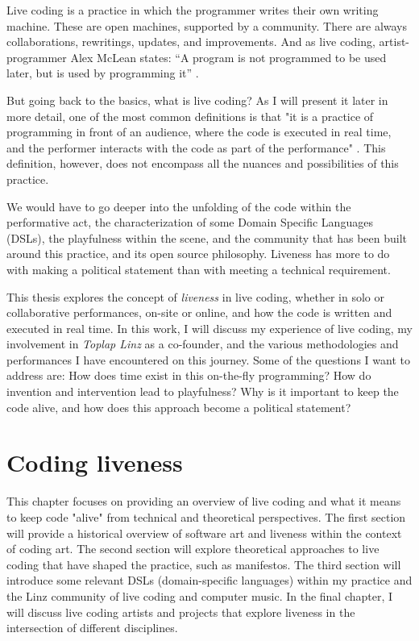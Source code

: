 \documentclass[12pt, twoside, a4paper]{report}
\begin{document}
Live coding is a practice in which the programmer writes their own writing machine. These are open machines, supported by a community.
 There are always collaborations, rewritings, updates, and improvements. And as live coding, artist-programmer Alex McLean states: ``A program is not programmed to be used later,
 but is used by programming it'' \citep{meaningLife}.

  But going back to the basics, what is live coding? As I will present it later 
  in more detail, one of the most common definitions is that "it is a practice of programming in front of an audience, where the code is executed in real time, 
  and the performer interacts with the code as part of the performance" \citep{cats}.
  This definition, however, does not encompass all the nuances and possibilities of this practice.
  
  We would have to go deeper into the unfolding of the code within the performative act,
  the characterization of some Domain Specific Languages (DSLs), the playfulness within the scene,
  and the community that has been built around this practice, 
  and its open source philosophy. Liveness has more to do with making a political statement than with meeting a technical requirement.

 This thesis explores the concept of \textit{liveness} in live coding, whether in solo or collaborative performances, on-site or online, and how the code is written and executed in real time. In this work, I will discuss my experience of live coding, my involvement in \textit{Toplap Linz} as a co-founder, and the various methodologies and performances I have encountered on this journey. Some of the questions I want to address are: How does time exist in this on-the-fly programming?
 How do invention and intervention lead to playfulness? Why is it important to keep the code alive, and how does this approach become a political statement?

\newpage

\chapter{Coding liveness}

This chapter focuses on providing an overview of live coding and what it
means to keep code "alive" from technical and theoretical perspectives.
The first section will provide a historical overview of software art and liveness within the context of coding art.
The second section will explore theoretical approaches to live coding that have shaped the practice, such as manifestos.  The third section will introduce some relevant DSLs (domain-specific languages) within my practice and the Linz community of live coding and computer music. In the final chapter, I will discuss live coding artists and projects that explore liveness in the intersection of different disciplines.
\end{document}
